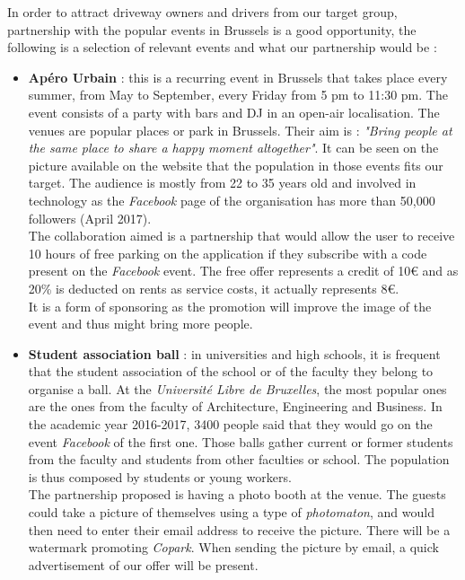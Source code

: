 \documentclass[12pt,a4paper,oneside]{book}
\newcommand{\bp}{\textit{Copark}}
\begin{document}
In order to attract driveway owners and drivers from our target group, partnership with the popular events in Brussels is a good opportunity, the following is a selection of relevant events and what our partnership would be :

\begin{itemize}
\item \textbf{Apéro Urbain} : this is a recurring event in Brussels that takes place every summer, from May to September, every Friday from 5 pm to 11:30 pm. The event consists of a party with bars and DJ in an open-air localisation. The venues are popular places or park in Brussels. Their aim is : \textit{"Bring people at the same place to share a happy moment altogether"}.\cite{aperourbain} It can be seen on the picture available on the website that the population in those events fits our target. The audience is mostly from 22 to 35 years old and involved in technology as the \textit{Facebook} page of the organisation has more than 50,000 followers (April 2017).\\
The collaboration aimed is a partnership that would allow the user to receive 10 hours of free parking on the application if they subscribe with a code present on the \textit{Facebook} event. The free offer represents a credit of 10\euro{} and as 20\% is deducted on rents as service costs, it actually represents 8\euro{}.\\
It is a form of sponsoring as the promotion will improve the image of the event and thus might bring more people.
\item \textbf{Student association ball} : in universities and high schools, it is frequent that the student association of the school or of the faculty they belong to organise a ball. At the \textit{Université Libre de Bruxelles}, the most popular ones are the ones from the faculty of Architecture, Engineering and Business. In the academic year 2016-2017, 3400 people said that they would go on the event \textit{Facebook} of the first one. Those balls gather current or former students from the faculty and students from other faculties or school. The population is thus composed by students or young workers.\\
The partnership proposed is having a photo booth at the venue. The guests could take a picture of themselves using a type of \textit{photomaton}, and would then need to enter their email address to receive the picture. There will be a watermark promoting \bp{}. When sending the picture by email, a quick advertisement of our offer will be present.

\end{itemize}
\end{document}
